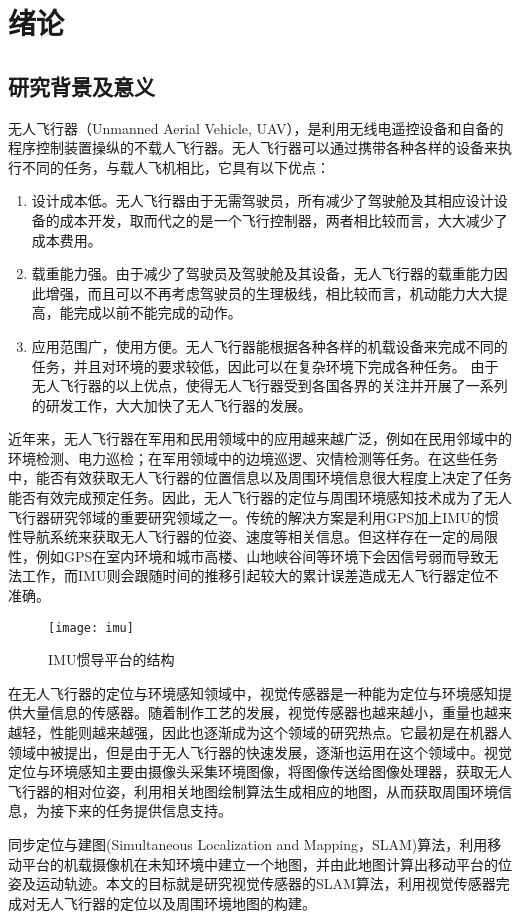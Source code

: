 \chapter{绪论}
\section{研究背景及意义}
无人飞行器（Unmanned Aerial Vehicle, UAV），是利用无线电遥控设备和自备的程序控制装置操纵的不载人飞行器。无人飞行器可以通过携带各种各样的设备来执行不同的任务，与载人飞机相比，它具有以下优点：\par
\begin{enumerate}
	\item 设计成本低。无人飞行器由于无需驾驶员，所有减少了驾驶舱及其相应设计设备的成本开发，取而代之的是一个飞行控制器，两者相比较而言，大大减少了成本费用。
	\item 载重能力强。由于减少了驾驶员及驾驶舱及其设备，无人飞行器的载重能力因此增强，而且可以不再考虑驾驶员的生理极线，相比较而言，机动能力大大提高，能完成以前不能完成的动作。
	\item 应用范围广，使用方便。无人飞行器能根据各种各样的机载设备来完成不同的任务，并且对环境的要求较低，因此可以在复杂环境下完成各种任务。
	由于无人飞行器的以上优点，使得无人飞行器受到各国各界的关注并开展了一系列的研发工作，大大加快了无人飞行器的发展。
\end{enumerate}\par
近年来，无人飞行器在军用和民用领域中的应用越来越广泛，例如在民用邻域中的环境检测、电力巡检；在军用领域中的边境巡逻、灾情检测等任务。在这些任务中，能否有效获取无人飞行器的位置信息以及周围环境信息很大程度上决定了任务能否有效完成预定任务。因此，无人飞行器的定位与周围环境感知技术成为了无人飞行器研究邻域的重要研究领域之一。传统的解决方案是利用GPS加上IMU的惯性导航系统来获取无人飞行器的位姿、速度等相关信息。但这样存在一定的局限性，例如GPS在室内环境和城市高楼、山地峡谷间等环境下会因信号弱而导致无法工作，而IMU则会跟随时间的推移引起较大的累计误差造成无人飞行器定位不准确。
\begin{figure}[htbp]
	\centering
	\texttt{[image: imu]}
	\caption{IMU惯导平台的结构}
\end{figure}\par
在无人飞行器的定位与环境感知领域中，视觉传感器是一种能为定位与环境感知提供大量信息的传感器。随着制作工艺的发展，视觉传感器也越来越小，重量也越来越轻，性能则越来越强，因此也逐渐成为这个领域的研究热点。它最初是在机器人领域中被提出，但是由于无人飞行器的快速发展，逐渐也运用在这个领域中。视觉定位与环境感知主要由摄像头采集环境图像，将图像传送给图像处理器，获取无人飞行器的相对位姿，利用相关地图绘制算法生成相应的地图，从而获取周围环境信息，为接下来的任务提供信息支持。\par
同步定位与建图(Simultaneous Localization and Mapping，SLAM)算法，利用移动平台的机载摄像机在未知环境中建立一个地图，并由此地图计算出移动平台的位姿及运动轨迹。本文的目标就是研究视觉传感器的SLAM算法，利用视觉传感器完成对无人飞行器的定位以及周围环境地图的构建。
